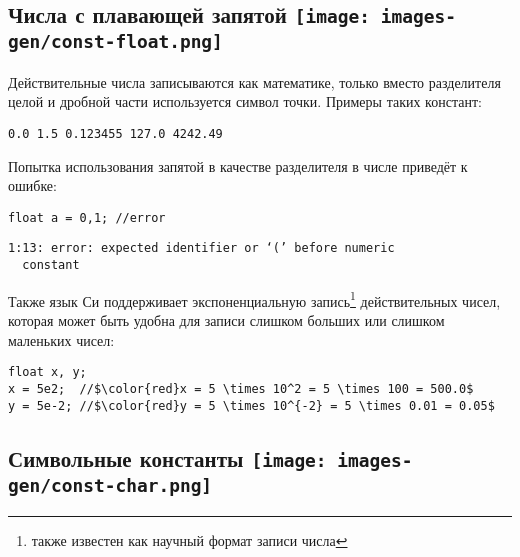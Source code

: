 \documentclass[myc.tex]{subfiles}
\begin{document}



















\subsection[Числа с плавающей запятой]{Числа с плавающей запятой \hfill\texttt{[image: images-gen/const-float.png]}}

Действительные числа записываются как математике, только вместо разделителя целой и дробной части используется символ точки. Примеры таких констант:

\texttt{0.0 1.5 0.123455 127.0 4242.49}

Попытка использования запятой в качестве разделителя в числе приведёт к ошибке:
\begin{lstlisting}
float a = 0,1; //error
\end{lstlisting}
\begin{small}
\begin{verbatim}
1:13: error: expected identifier or ‘(’ before numeric 
  constant
\end{verbatim} 
\end{small}

Также язык Си поддерживает экспоненциальную запись\footnote{также известен как научный формат записи числа} действительных чисел, которая может быть удобна для записи слишком больших или слишком маленьких чисел:
\begin{lstlisting}
float x, y;
x = 5e2;  //$\color{red}x = 5 \times 10^2 = 5 \times 100 = 500.0$
y = 5e-2; //$\color{red}y = 5 \times 10^{-2} = 5 \times 0.01 = 0.05$
\end{lstlisting}
























\subsection[Символьные константы]{Символьные константы \hfill\texttt{[image: images-gen/const-char.png]}}
\end{document}
